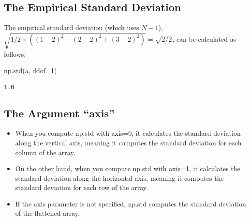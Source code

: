 \documentclass[
  letterpaper,
  DIV=11,
  numbers=noendperiod]{scrreprt}
\newenvironment{Shaded}{\begin{snugshade}}{\end{snugshade}}
\newcommand{\DecValTok}[1]{\textcolor[rgb]{0.68,0.00,0.00}{#1}}
\newcommand{\NormalTok}[1]{\textcolor[rgb]{0.00,0.23,0.31}{#1}}
\newcommand{\OperatorTok}[1]{\textcolor[rgb]{0.37,0.37,0.37}{#1}}
\providecommand{\tightlist}{%
  \setlength{\itemsep}{0pt}\setlength{\parskip}{0pt}}\usepackage{longtable,booktabs,array}
\begin{document}
\hypertarget{the-empirical-standard-deviation}{%
\subsection{The Empirical Standard
Deviation}\label{the-empirical-standard-deviation}}

The empirical standard deviation (which uses \(N-1\)),
\(\sqrt{1/2 \times \left( (1-2)^2 + (2-2)^2 + (3-2)^2 \right)} = \sqrt{2/2}\),
can be calculated as follows:

\begin{Shaded}
\begin{Highlighting}[]
\NormalTok{np.std(a, ddof}\OperatorTok{=}\DecValTok{1}\NormalTok{)}
\end{Highlighting}
\end{Shaded}

\begin{verbatim}
1.0
\end{verbatim}

\hypertarget{the-argument-axis}{%
\subsection{The Argument ``axis''}\label{the-argument-axis}}

\begin{tcolorbox}[enhanced jigsaw, opacityback=0, left=2mm, title=\textcolor{quarto-callout-note-color}{\faInfo}\hspace{0.5em}{Axes along which the standard deviation is computed}, bottomrule=.15mm, titlerule=0mm, arc=.35mm, leftrule=.75mm, colbacktitle=quarto-callout-note-color!10!white, bottomtitle=1mm, opacitybacktitle=0.6, coltitle=black, colframe=quarto-callout-note-color-frame, toprule=.15mm, breakable, colback=white, toptitle=1mm, rightrule=.15mm]

\begin{itemize}
\tightlist
\item
  When you compute np.std with axis=0, it calculates the standard
  deviation along the vertical axis, meaning it computes the standard
  deviation for each column of the array.
\item
  On the other hand, when you compute np.std with axis=1, it calculates
  the standard deviation along the horizontal axis, meaning it computes
  the standard deviation for each row of the array.
\item
  If the axis parameter is not specified, np.std computes the standard
  deviation of the flattened array.
\end{itemize}

\end{tcolorbox}
\end{document}
